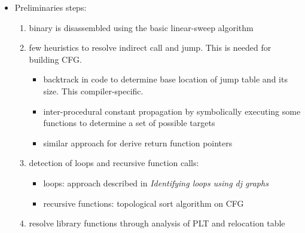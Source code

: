 \begin{itemize}
  \item Preliminaries steps:
    \begin{enumerate}
      \item binary is disassembled using the basic linear-sweep algorithm
      \item few heuristics to resolve indirect call and jump. This is needed for building CFG.
        \begin{itemize}
          \item backtrack in code to determine base location of jump table and its size. This compiler-specific.
          \item inter-procedural constant propagation by symbolically executing some functions to determine a set of possible targets
          \item similar approach for derive return function pointers
        \end{itemize}
      \item detection of loops and recursive function calls:
        \begin{itemize}
          \item loops: approach described in {\em Identifying loops using dj graphs}
          \item recursive functions: topological sort algorithm on CFG
        \end{itemize}
      \item resolve library functions through analysis of PLT and relocation table
    \end{enumerate}
\end{itemize}

